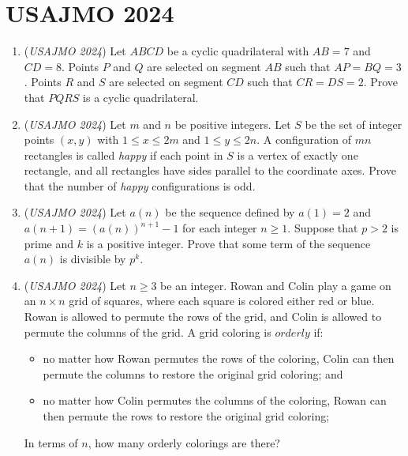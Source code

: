 \section{USAJMO 2024}
        \begin{enumerate}
        	\item (\textit{USAJMO 2024}) Let $ABCD$ be a cyclic quadrilateral with $AB = 7$ and $CD = 8$. Points $P$ and $Q$ are selected on segment $AB$ such that $AP = BQ = 3$. Points $R$ and $S$ are selected on segment $CD$ such that $CR = DS = 2$. Prove that $PQRS$ is a cyclic quadrilateral.


 

	\item (\textit{USAJMO 2024}) Let $m$ and $n$ be positive integers. Let $S$ be the set of integer points $(x,y)$ with $1\leq x\leq2m$ and $1\leq y\leq2n$. A configuration of $mn$ rectangles is called \textit{happy} if each point in $S$ is a vertex of exactly one rectangle, and all rectangles have sides parallel to the coordinate axes. Prove that the number of \textit{happy} configurations is odd.


 

	\item (\textit{USAJMO 2024}) Let $a(n)$ be the sequence defined by $a(1)=2$ and $a(n+1)=(a(n))^{n+1}-1$ for each integer $n\geq1$. Suppose that $p>2$ is prime and $k$ is a positive integer. Prove that some term of the sequence $a(n)$ is divisible by $p^k$.


 

	\item (\textit{USAJMO 2024}) Let $n \ge 3$ be an integer. Rowan and Colin play a game on an $n \times n$ grid of squares, where each square is colored either red or blue. Rowan is allowed to permute the rows of the grid, and Colin is allowed to permute the columns of the grid. A grid coloring is $orderly$ if:


 
            \begin{itemize}
        \item no matter how Rowan permutes the rows of the coloring, Colin can then permute the columns to restore the original grid coloring; and
            \end{itemize}
            
            \begin{itemize}
        \item no matter how Colin permutes the columns of the coloring, Rowan can then permute the rows to restore the original grid coloring;
            \end{itemize}
            In terms of $n$, how many orderly colorings are there?



\end{enumerate}
